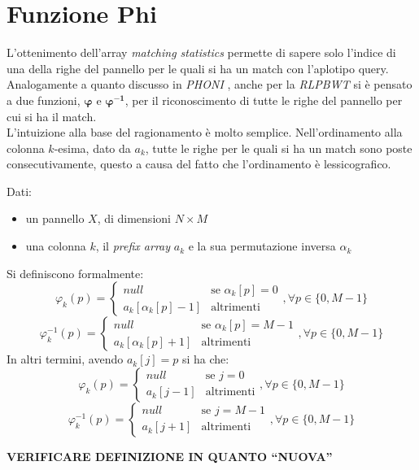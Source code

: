 \section{Funzione Phi}
\label{secphi}
L'ottenimento dell'array \textit{matching statistics} permette di sapere solo
l'indice di una della righe del pannello per le quali si ha un match con
l'aplotipo query. Analogamente a quanto discusso in \textit{PHONI} \cite{phoni},
anche per la \textit{RLPBWT} si è pensato a due funzioni, $\boldsymbol\varphi$ e
$\boldsymbol\varphi\mathbf{^{-1}}$, per il riconoscimento di tutte le
righe del pannello per cui si ha il match.\\
L'intuizione alla base del ragionamento è molto semplice. Nell'ordinamento alla
colonna $k$-esima, dato da $a_k$, tutte le righe per le quali si ha un match
sono poste consecutivamente, questo a causa del fatto che l'ordinamento è
lessicografico.
\begin{definizione}
  Dati:
  \begin{itemize}
    \item un pannello $X$, di dimensioni $N\times M$
    \item una colonna $k$, il \textit{prefix array} $a_k$ e la sua permutazione
    inversa $\alpha_k$
  \end{itemize}
  Si definiscono formalmente:
  \[\varphi_k(p)=
    \begin{cases}
      null&\mbox{se }\alpha_k[p]=0\\
      a_k[\alpha_k[p]-1]&\mbox{altrimenti}
    \end{cases},\forall p\in\{0,M-1\}
  \]
  \[\varphi^{-1}_k(p)=
    \begin{cases}
      null&\mbox{se }\alpha_k[p]=M-1\\
      a_k[\alpha_k[p]+1]&\mbox{altrimenti}
    \end{cases},\forall p\in\{0,M-1\}
  \]
  In altri termini, avendo $a_k[j]=p$ si ha che:
  \[\varphi_k(p)=
    \begin{cases}
      null&\mbox{se }j=0\\
      a_k[j-1]&\mbox{altrimenti}
    \end{cases},\forall p\in\{0,M-1\}
  \]
  \[\varphi^{-1}_k(p)=
    \begin{cases}
      null&\mbox{se }j=M-1\\
      a_k[j+1]&\mbox{altrimenti}
    \end{cases},\forall p\in\{0,M-1\}
  \]
\end{definizione}
\textbf{VERIFICARE DEFINIZIONE IN QUANTO ``NUOVA''}
